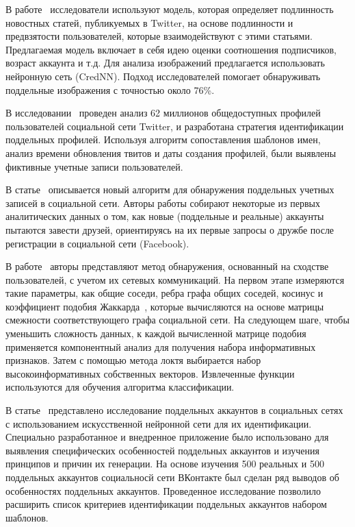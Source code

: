 В работе~\cite{UppadaMVHS22} исследователи используют модель, которая определяет подлинность новостных статей, публикуемых в Twitter, на основе подлинности и предвзятости пользователей, которые взаимодействуют с этими статьями. Предлагаемая модель включает в себя идею оценки соотношения подписчиков, возраст аккаунта и т.д. Для анализа изображений предлагается использовать нейронную сеть (CredNN). Подход исследователей помогает обнаруживать поддельные изображения с точностью около 76\%.
    
В исследовании~\cite{GurajalaWHM15} проведен анализ 62 миллионов общедоступных профилей пользователей социальной сети Twitter, и разработана стратегия идентификации поддельных профилей. Используя алгоритм сопоставления шаблонов имен, анализ времени обновления твитов и даты создания профилей, были выявлены фиктивные учетные записи пользователей. 

В статье~\cite{abs-2308-05353} описывается новый алгоритм для обнаружения поддельных учетных записей в социальной сети. Авторы работы собирают некоторые из первых аналитических данных о том, как новые (поддельные и реальные) аккаунты пытаются завести друзей, ориентируясь на их первые запросы о дружбе после регистрации в социальной сети (Facebook). 

В работе~\cite{MohammadrezaeiS19} авторы представляют метод обнаружения, основанный на сходстве пользователей, с учетом их сетевых коммуникаций. На первом этапе измеряются такие параметры, как общие соседи, ребра графа общих соседей, косинус и коэффициент подобия Жаккарда~\cite{SantistebanT15}, которые вычисляются на основе матрицы смежности соответствующего графа социальной сети. На следующем шаге, чтобы уменьшить сложность данных, к каждой вычисленной матрице подобия применяется компонентный анализ для получения набора информативных признаков. Затем с помощью метода локтя выбирается набор высокоинформативных собственных векторов. Извлеченные функции используются для обучения алгоритма классификации. 

В статье~\cite{StolbovaGI21} представлено исследование поддельных аккаунтов в социальных сетях с использованием искусственной нейронной сети для их идентификации. Специально разработанное и внедренное приложение было использовано для выявления специфических особенностей поддельных аккаунтов и изучения принципов и причин их генерации. На основе изучения 500 реальных и 500 поддельных аккаунтов социальносй сети ВКонтакте был сделан ряд выводов об особенностях поддельных аккаунтов. Проведенное исследование позволило расширить список критериев идентификации поддельных аккаунтов набором шаблонов.

